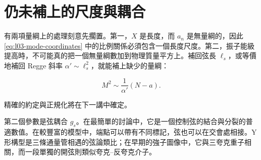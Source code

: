 \begin{classroomqa}
\end{classroomqa}

\section{仍未補上的尺度與耦合}

有兩項量綱上的處理刻意先擱置。第一，\(X\) 是長度，而 \(a_n\) 是無量綱的，因此 \eqref{eq:l03-mode-coordinates} 中的比例關係必須包含一個長度尺度。第二，振子能級提高時，不可能真的把一個無量綱數加到物理質量平方上。補回弦長 \(\ell_s\)，或等價地補回 Regge 斜率 \(\alpha'\sim\ell_s^2\)，就能補上缺少的量綱：

\begin{equation}
  M^2\sim\frac{1}{\alpha'}(N-a).
  \label{eq:l03-dimensional-spectrum}
\end{equation}

精確的約定與正規化將在下一講中確定。

\begin{classroomqa}
\end{classroomqa}

第二個參數是弦耦合 \(g_s\)。在最簡單的討論中，它是一個控制弦的結合與分裂的普適數值。在較豐富的模型中，端點可以帶有不同標記，弦也可以在交會處相接。Y 形構型是三條通量管相遇的弦論類比；在早期的強子圖像中，它與三夸克重子相關，而一段單獨的開弦則類似夸克--反夸克介子。

\begin{classroomqa}
\end{classroomqa}

\begin{classroomqa}
\end{classroomqa}

